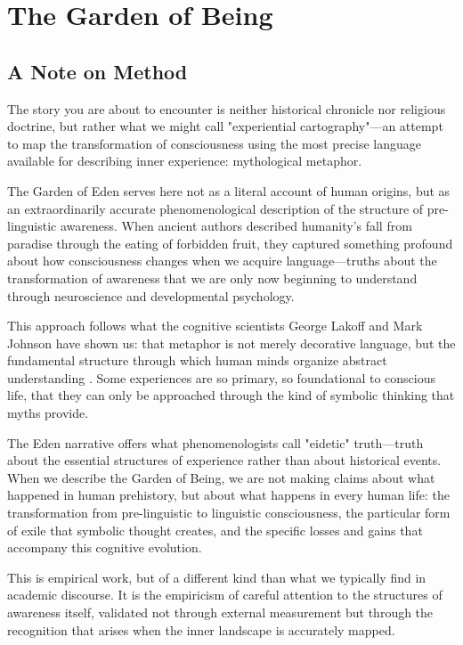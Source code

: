 \chapter{The Garden of Being}

\section{A Note on Method}

The story you are about to encounter is neither historical chronicle nor religious doctrine, but rather what we might call "experiential cartography"—an attempt to map the transformation of consciousness using the most precise language available for describing inner experience: mythological metaphor.

The Garden of Eden serves here not as a literal account of human origins, but as an extraordinarily accurate phenomenological description of the structure of pre-linguistic awareness. When ancient authors described humanity's fall from paradise through the eating of forbidden fruit, they captured something profound about how consciousness changes when we acquire language—truths about the transformation of awareness that we are only now beginning to understand through neuroscience and developmental psychology.

This approach follows what the cognitive scientists George Lakoff and Mark Johnson have shown us: that metaphor is not merely decorative language, but the fundamental structure through which human minds organize abstract understanding \parencite{lakoff1980metaphors}. Some experiences are so primary, so foundational to conscious life, that they can only be approached through the kind of symbolic thinking that myths provide.

The Eden narrative offers what phenomenologists call "eidetic" truth—truth about the essential structures of experience rather than about historical events. When we describe the Garden of Being, we are not making claims about what happened in human prehistory, but about what happens in every human life: the transformation from pre-linguistic to linguistic consciousness, the particular form of exile that symbolic thought creates, and the specific losses and gains that accompany this cognitive evolution.

This is empirical work, but of a different kind than what we typically find in academic discourse. It is the empiricism of careful attention to the structures of awareness itself, validated not through external measurement but through the recognition that arises when the inner landscape is accurately mapped.


